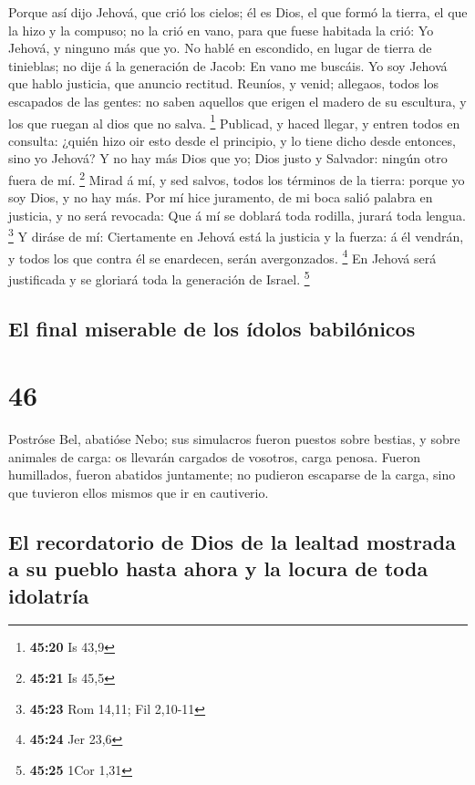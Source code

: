  Porque así dijo Jehová, que crió los cielos; él es Dios,
el que formó la tierra, el que la hizo y la compuso; no la crió en vano,
para que fuese habitada la crió: Yo Jehová, y ninguno más que yo.
 No hablé en escondido, en lugar de tierra de tinieblas;
no dije á la generación de Jacob: En vano me buscáis. Yo soy Jehová que
hablo justicia, que anuncio rectitud.  Reuníos, y venid;
allegaos, todos los escapados de las gentes: no saben aquellos que
erigen el madero de su escultura, y los que ruegan al dios que no salva.
\footnote{\textbf{45:20} Is 43,9}  Publicad, y haced
llegar, y entren todos en consulta: ¿quién hizo oir esto desde el
principio, y lo tiene dicho desde entonces, sino yo Jehová? Y no hay más
Dios que yo; Dios justo y Salvador: ningún otro fuera de mí. \footnote{\textbf{45:21}
  Is 45,5}  Mirad á mí, y sed salvos, todos los términos
de la tierra: porque yo soy Dios, y no hay más.  Por mí
hice juramento, de mi boca salió palabra en justicia, y no será
revocada: Que á mí se doblará toda rodilla, jurará toda lengua.
\footnote{\textbf{45:23} Rom 14,11; Fil 2,10-11}  Y
diráse de mí: Ciertamente en Jehová está la justicia y la fuerza: á él
vendrán, y todos los que contra él se enardecen, serán avergonzados.
\footnote{\textbf{45:24} Jer 23,6}  En Jehová será
justificada y se gloriará toda la generación de Israel. \footnote{\textbf{45:25}
  1Cor 1,31}

\hypertarget{el-final-miserable-de-los-uxeddolos-babiluxf3nicos}{%
\subsection{El final miserable de los ídolos
babilónicos}\label{el-final-miserable-de-los-uxeddolos-babiluxf3nicos}}

\hypertarget{section-45}{%
\section{46}\label{section-45}}

 Postróse Bel, abatióse Nebo; sus simulacros fueron
puestos sobre bestias, y sobre animales de carga: os llevarán cargados
de vosotros, carga penosa.  Fueron humillados, fueron
abatidos juntamente; no pudieron escaparse de la carga, sino que
tuvieron ellos mismos que ir en cautiverio.

\hypertarget{el-recordatorio-de-dios-de-la-lealtad-mostrada-a-su-pueblo-hasta-ahora-y-la-locura-de-toda-idolatruxeda}{%
\subsection{El recordatorio de Dios de la lealtad mostrada a su pueblo
hasta ahora y la locura de toda
idolatría}\label{el-recordatorio-de-dios-de-la-lealtad-mostrada-a-su-pueblo-hasta-ahora-y-la-locura-de-toda-idolatruxeda}}

